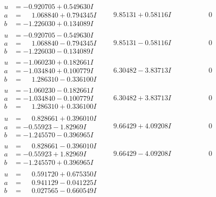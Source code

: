 \documentclass[1p]{elsarticle_modified}
\theoremstyle{definition}
\begin{document}
$$\begin{array}{c|c|c}
\begin{aligned}
u &= -0.920705 + 0.549630 I \\
a &= \phantom{-}1.068840 + 0.794345 I \\
b &= -1.226030 + 0.134089 I\end{aligned}
 & \phantom{-}9.85131 + 0.58116 I & \phantom{-0.000000 } 0 \\ \hline\begin{aligned}
u &= -0.920705 - 0.549630 I \\
a &= \phantom{-}1.068840 - 0.794345 I \\
b &= -1.226030 - 0.134089 I\end{aligned}
 & \phantom{-}9.85131 - 0.58116 I & \phantom{-0.000000 } 0 \\ \hline\begin{aligned}
u &= -1.060230 + 0.182661 I \\
a &= -1.034840 + 0.100779 I \\
b &= \phantom{-}1.286310 - 0.336100 I\end{aligned}
 & \phantom{-}6.30482 - 3.83713 I & \phantom{-0.000000 } 0 \\ \hline\begin{aligned}
u &= -1.060230 - 0.182661 I \\
a &= -1.034840 - 0.100779 I \\
b &= \phantom{-}1.286310 + 0.336100 I\end{aligned}
 & \phantom{-}6.30482 + 3.83713 I & \phantom{-0.000000 } 0 \\ \hline\begin{aligned}
u &= \phantom{-}0.828661 + 0.396010 I \\
a &= -0.55923 - 1.82969 I \\
b &= -1.245570 - 0.396965 I\end{aligned}
 & \phantom{-}9.66429 + 4.09208 I & \phantom{-0.000000 } 0 \\ \hline\begin{aligned}
u &= \phantom{-}0.828661 - 0.396010 I \\
a &= -0.55923 + 1.82969 I \\
b &= -1.245570 + 0.396965 I\end{aligned}
 & \phantom{-}9.66429 - 4.09208 I & \phantom{-0.000000 } 0 \\ \hline\begin{aligned}
u &= \phantom{-}0.591720 + 0.675350 I \\
a &= \phantom{-}0.941129 - 0.041225 I \\
b &= \phantom{-}0.027565 - 0.660549 I\end{aligned}

\end{array}$$
\end{document}
